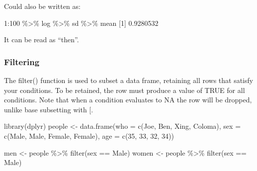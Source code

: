 \documentclass[
]{book}
\newenvironment{Shaded}{\begin{snugshade}}{\end{snugshade}}
\newcommand{\AttributeTok}[1]{\textcolor[rgb]{0.77,0.63,0.00}{#1}}
\newcommand{\DecValTok}[1]{\textcolor[rgb]{0.00,0.00,0.81}{#1}}
\newcommand{\FloatTok}[1]{\textcolor[rgb]{0.00,0.00,0.81}{#1}}
\newcommand{\FunctionTok}[1]{\textcolor[rgb]{0.00,0.00,0.00}{#1}}
\newcommand{\NormalTok}[1]{#1}
\newcommand{\OtherTok}[1]{\textcolor[rgb]{0.56,0.35,0.01}{#1}}
\newcommand{\SpecialCharTok}[1]{\textcolor[rgb]{0.00,0.00,0.00}{#1}}
\newcommand{\StringTok}[1]{\textcolor[rgb]{0.31,0.60,0.02}{#1}}
\begin{document}
Could also be written as:

\begin{Shaded}
\begin{Highlighting}[]
\DecValTok{1}\SpecialCharTok{:}\DecValTok{100} \SpecialCharTok{\%\textgreater{}\%}\NormalTok{ log }\SpecialCharTok{\%\textgreater{}\%}\NormalTok{ sd }\SpecialCharTok{\%\textgreater{}\%}\NormalTok{ mean}
\NormalTok{[}\DecValTok{1}\NormalTok{] }\FloatTok{0.9280532}
\end{Highlighting}
\end{Shaded}

It can be read as ``then''.

\hypertarget{filtering}{%
\subsubsection*{Filtering}\label{filtering}}

The filter() function is used to subset a data frame, retaining all rows that satisfy your conditions. To be retained, the row must produce a value of TRUE for all conditions. Note that when a condition evaluates to NA the row will be dropped, unlike base subsetting with {[}.

\begin{Shaded}
\begin{Highlighting}[]
\FunctionTok{library}\NormalTok{(dplyr)}
\NormalTok{people }\OtherTok{\textless{}{-}} \FunctionTok{data.frame}\NormalTok{(}\AttributeTok{who =} \FunctionTok{c}\NormalTok{(}\StringTok{\textquotesingle{}Joe\textquotesingle{}}\NormalTok{, }\StringTok{\textquotesingle{}Ben\textquotesingle{}}\NormalTok{, }\StringTok{\textquotesingle{}Xing\textquotesingle{}}\NormalTok{, }\StringTok{\textquotesingle{}Coloma\textquotesingle{}}\NormalTok{),}
                    \AttributeTok{sex =} \FunctionTok{c}\NormalTok{(}\StringTok{\textquotesingle{}Male\textquotesingle{}}\NormalTok{, }\StringTok{\textquotesingle{}Male\textquotesingle{}}\NormalTok{, }\StringTok{\textquotesingle{}Female\textquotesingle{}}\NormalTok{, }\StringTok{\textquotesingle{}Female\textquotesingle{}}\NormalTok{),}
                    \AttributeTok{age =} \FunctionTok{c}\NormalTok{(}\DecValTok{35}\NormalTok{, }\DecValTok{33}\NormalTok{, }\DecValTok{32}\NormalTok{, }\DecValTok{34}\NormalTok{))}

\NormalTok{men }\OtherTok{\textless{}{-}}\NormalTok{ people }\SpecialCharTok{\%\textgreater{}\%}
  \FunctionTok{filter}\NormalTok{(sex }\SpecialCharTok{==} \StringTok{\textquotesingle{}Male\textquotesingle{}}\NormalTok{)}
\NormalTok{women }\OtherTok{\textless{}{-}}\NormalTok{ people }\SpecialCharTok{\%\textgreater{}\%}
  \FunctionTok{filter}\NormalTok{(sex }\SpecialCharTok{==} \StringTok{\textquotesingle{}Male\textquotesingle{}}\NormalTok{)}
\end{Highlighting}
\end{Shaded}
\end{document}
